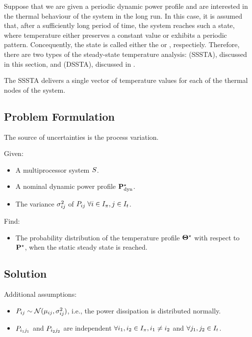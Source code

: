 Suppose that we are given a periodic dynamic power profile and are interested in the thermal behaviour of the system in the long run. In this case, it is assumed that, after a sufficiently long period of time, the system reaches such a state, where temperature either preserves a constant value or exhibits a periodic pattern. Concequently, the state is called either the  or , respectiely. Therefore, there are two types of the steady-state temperature analysis:  (SSSTA), discussed in this section, and  (DSSTA), discussed in .

The SSSTA delivers a single vector of temperature values for each of the thermal nodes of the system.

\subsection{Problem Formulation}
The source of uncertainties is the process variation.

Given:
\begin{itemize}
  \item A multiprocessor system $S$.
  \item A nominal dynamic power profile $\mathbf{P}^\star_{\text{dyn}}$.
  \item The variance $\sigma_{ij}^2$ of $P_{ij} \; \forall i \in I_\pi, j \in I_t$.
\end{itemize}

Find:
\begin{itemize}
  \item The probability distribution of the temperature profile $\mathbf{\Theta}^\star$ with respect to $\mathbf{P}^\star$, when the static steady state is reached.
\end{itemize}

\subsection{Solution} 
Additional assumptions:
\begin{itemize}
  \item $P_{ij} \sim \mathcal{N}(\mu_{ij}, \sigma_{ij}^2)$, i.e., the power dissipation is distributed normally.
  \item $P_{i_1 j_1}$ and $P_{i_2 j_2}$ are independent $\forall i_1, i_2 \in I_\pi,  i_1 \neq i_2$ and $\forall j_1, j_2 \in I_t$.
\end{itemize}

